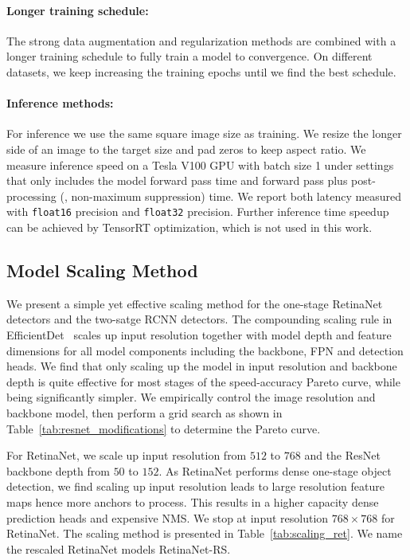 \documentclass[final]{cvpr}
\begin{document}
\paragraph{Longer training schedule:} The strong data augmentation and regularization methods are combined with a longer training schedule to fully train a model to convergence. On different datasets, we keep increasing the training epochs until we find the best schedule.

\paragraph{Inference methods:} For inference we use the same square image size as training. We resize the longer side of an image to the target size and pad zeros to keep aspect ratio. We measure inference speed on a Tesla V100 GPU with batch size 1 under settings that only includes the model forward pass time and forward pass plus post-processing (\eg, non-maximum suppression) time. We report both latency measured with \texttt{float16} precision and \texttt{float32} precision. Further inference time speedup can be achieved by TensorRT optimization, which is not used in this work.


\subsection{Model Scaling Method}\label{sec:scaling_method}
We present a simple yet effective scaling method for the one-stage RetinaNet detectors and the two-satge RCNN detectors. The compounding scaling rule in EfficientDet~\cite{tan2019efficientnet,efficientdet} scales up input resolution together with model depth and feature dimensions for all model components including the backbone, FPN and detection heads. We find that only scaling up the model in input resolution and backbone depth is quite effective for most stages of the speed-accuracy Pareto curve, while being significantly simpler. We empirically control the image resolution and backbone model, then perform a grid search as shown in Table~\ref{tab:resnet_modifications} to determine the Pareto curve.

For RetinaNet, we scale up input resolution from $512$ to $768$ and the ResNet backbone depth from $50$ to $152$. As RetinaNet performs dense one-stage object detection, we find scaling up input resolution leads to large resolution feature maps hence more anchors to process. This results in a higher capacity dense prediction heads and expensive NMS. We stop at input resolution $768\times768$ for RetinaNet.
The scaling method is presented in Table~\ref{tab:scaling_ret}. We name the rescaled RetinaNet models RetinaNet-RS.
\end{document}
